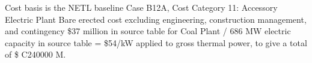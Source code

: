 Cost basis is the NETL baseline Case B12A, Cost Category 11: Accessory Electric Plant Bare erected cost excluding engineering, construction management, and contingency \$37 million in source table for Coal Plant / 686 MW electric capacity in source table = \$54/kW applied to gross  thermal power, to give a total of \$ C240000 M.
